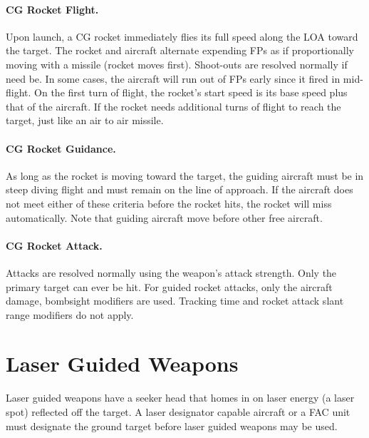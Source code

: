 \paragraph{CG Rocket Flight.} Upon launch, a CG rocket immediately flies its full speed along the LOA toward the target. The rocket and aircraft alternate expending FPs as if proportionally moving with a missile (rocket moves first). Shoot-outs are resolved normally if need be. In some cases, the aircraft will run out of FPs early since it fired in mid-flight. On the first turn of flight, the rocket's start speed is its base speed plus that of the aircraft. If the rocket needs additional turns of flight to reach the target,  just like an air to air missile.

\paragraph{CG Rocket Guidance.} As long as the rocket is moving toward the target, the guiding aircraft must be in steep diving flight and must remain on the line of approach. If the aircraft does not meet either of these criteria before the rocket hits, the rocket will miss automatically. Note that guiding aircraft move before other free aircraft.

\paragraph{CG Rocket Attack.} Attacks are resolved normally using the weapon's attack strength. Only the primary target can ever be hit.  For guided rocket attacks, only the aircraft damage, bombsight modifiers are used. Tracking time and rocket attack slant range modifiers do not apply.

\section{Laser Guided Weapons}
\label{rule:laser-guided-weapons}

Laser guided weapons have a seeker head that homes in on laser energy (a laser spot) reflected off the target. A laser designator capable aircraft or a FAC unit must designate the ground target before laser guided weapons may be used.

